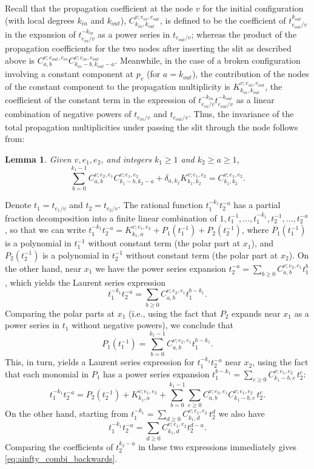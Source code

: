 \documentclass[11pt,leqno]{amsart}
\newtheorem{lemma}[theo]{Lemma}
\numberwithin{equation}{section}
\begin{document}
Recall that the propagation coefficient at the node $v$ for the initial configuration (with
local degrees $k_{in}$ and $k_{out}$),
$C^{v;e_{in},e_{out}}_{k_{in},k_{out}}$, is defined to be the coefficient of
$t_{e_{out}/v}^{k_{out}}$ in the expansion of $t_{e_{in}/v}^{-k_{in}}$ as a
power series in $t_{e_{out}/v}$; whereas the product of the propagation
coefficients for the two nodes after inserting the slit as described above
is $C^{v;e_{out},e_{in}}_{a,b} C^{v;e_{in},e_{out}}_{k_{in}-b,k_{out}-a}$.
Meanwhile, in the case of a broken configuration involving a constant component at $p_v$ 
(for $a=k_{out}$), the contribution of the nodes of the constant component
to the propagation multiplicity is $K^{v;e_{in},e_{out}}_{k_{in},k_{out}}$,
the coefficient of the constant term in the expression of 
$t_{e_{in}/v}^{-k_{in}}t_{e_{out}/v}^{-k_{out}}$ as a linear combination of
negative powers of $t_{e_{in}/v}$ and $t_{e_{out}/v}$. Thus, 
the invariance of the total propagation multiplicities under
passing the slit through the node follows from:

\begin{lemma} \label{l:ainfty_combi_backwards}
Given $v,e_1,e_2$, and integers $k_{1}\geq 1$ and $k_{2}\geq a\geq 1$,
\begin{equation} \label{eq:ainfty_combi_backwards}
\sum_{b=0}^{k_{1}-1} C^{v;e_{2},e_{1}}_{a,b} C^{v;e_{1},e_{2}}_{k_{1}-b,k_{2}-a}
+\delta_{a,k_{2}} K^{v;e_{1},e_{2}}_{k_{1},k_{2}} =
C^{v;e_{1},e_{2}}_{k_{1},k_{2}}.
\end{equation}
\end{lemma}

\proof
Denote $t_1=t_{e_1/v}$ and $t_2=t_{e_2/v}$. 
The rational function $t_1^{-k_1}t_2^{-a}$ has a partial fraction
decomposition into a finite linear combination of
$1,t_1^{-1},\dots,t_1^{-k_1},t_2^{-1},\dots,t_2^{-a}$, so that we can write
$t_1^{-k_1}t_2^{-a}=K^{v;e_1,e_2}_{k_1,a}+P_1(t_1^{-1})+P_2(t_2^{-1})$, where
$P_1(t_1^{-1})$ is a polynomial 
in $t_1^{-1}$ without constant term (the polar part at $x_1$), and $P_2(t_2^{-1})$ is a
polynomial in $t_2^{-1}$ without constant term (the polar part at $x_2$).
On the other hand, near $x_1$ we have the power series expansion
$t_2^{-a}=\sum\limits_{b\geq 0} C^{v;e_2,e_1}_{a,b} t_1^b$, which yields the
Laurent series expression
$$t_1^{-k_1} t_2^{-a}=\sum_{b\geq 0} C^{v;e_2,e_1}_{a,b} t_1^{b-k_1}.$$
Comparing the polar parts at $x_1$ (i.e., using the fact that $P_2$ expands
near $x_1$ as a power series in $t_1$ without negative powers), we conclude that
$$P_1(t_1^{-1})=\sum_{b=0}^{k_1-1} C^{v;e_2,e_1}_{a,b} t_1^{b-k_1}.$$
This, in turn, yields a Laurent series expression for $t_1^{-k_1}t_2^{-a}$
near $x_2$, using the fact that each monomial in $P_1$ has a power series
expansion $t_1^{b-k_1}=\sum\limits_{c\geq 0}C^{v;e_1,e_2}_{k_1-b,c}\,t_2^c$:
$$t_1^{-k_1}t_2^{-a}=P_2(t_2^{-1})+K^{v;e_1,e_2}_{k_1,a}+
\sum_{b=0}^{k_1-1}\sum_{c\geq 0}
C^{v;e_2,e_1}_{a,b} C^{v;e_1,e_2}_{k_1-b,c}\, t_2^c.$$
On the other hand, starting from $t_1^{-k_1}=\sum\limits_{d\geq 0}
C_{k_1,d}^{v;e_1,e_2}\,t_2^d$ we also have
$$t_1^{-k_1} t_2^{-a}=\sum_{d\geq 0} C^{v;e_1,e_2}_{k_1,d} t_2^{d-a}.$$
Comparing the coefficients of $t_2^{k_2-a}$ in these two
expressions immediately gives \eqref{eq:ainfty_combi_backwards}.
\endproof
\end{document}
